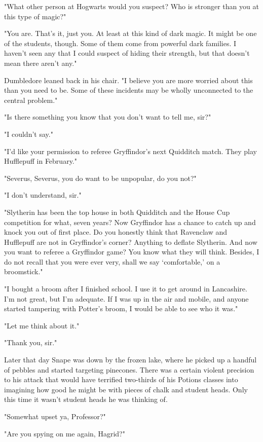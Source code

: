 \documentclass[a4paper,11pt]{article}
\begin{document}
"What other person at Hogwarts would you suspect? Who is stronger than you at this type of magic?"

"You are. That's it, just you. At least at this kind of dark magic. It might be one of the students, though. Some of them come from powerful dark families. I haven't seen any that I could suspect of hiding their strength, but that doesn't mean there aren't any."

Dumbledore leaned back in his chair. "I believe you are more worried about this than you need to be. Some of these incidents may be wholly unconnected to the central problem."

"Is there something you know that you don't want to tell me, sir?"

"I couldn't say."

"I'd like your permission to referee Gryffindor's next Quidditch match. They play Hufflepuff in February."

"Severus, Severus, you do want to be unpopular, do you not?"

"I don't understand, sir."

"Slytherin has been the top house in both Quidditch and the House Cup competition for what, seven years? Now Gryffindor has a chance to catch up and knock you out of first place. Do you honestly think that Ravenclaw and Hufflepuff are not in Gryffindor's corner? Anything to deflate Slytherin. And now you want to referee a Gryffindor game? You know what they will think. Besides, I do not recall that you were ever very, shall we say `comfortable,' on a broomstick."

"I bought a broom after I finished school. I use it to get around in Lancashire. I'm not great, but I'm adequate. If I was up in the air and mobile, and anyone started tampering with Potter's broom, I would be able to see who it was."

"Let me think about it."

"Thank you, sir."

Later that day Snape was down by the frozen lake, where he picked up a handful of pebbles and started targeting pinecones. There was a certain violent precision to his attack that would have terrified two-thirds of his Potions classes into imagining how good he might be with pieces of chalk and student heads. Only this time it wasn't student heads he was thinking of.

"Somewhat upset ya, Professor?"

"Are you spying on me again, Hagrid?"
\end{document}
